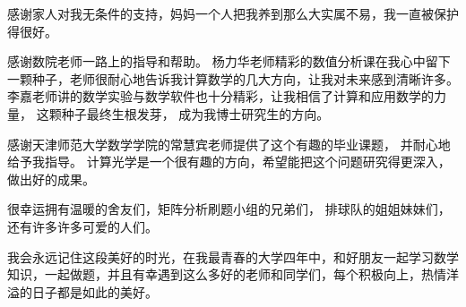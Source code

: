 \documentclass[12pt]{article}
\begin{document}
感谢家人对我无条件的支持，妈妈一个人把我养到那么大实属不易，我一直被保护得很好。

感谢数院老师一路上的指导和帮助。 杨力华老师精彩的数值分析课在我心中留下一颗种子，老师很耐心地告诉我计算数学的几大方向，让我对未来感到清晰许多。 李嘉老师讲的数学实验与数学软件也十分精彩，让我相信了计算和应用数学的力量， 这颗种子最终生根发芽， 成为我博士研究生的方向。

感谢天津师范大学数学学院的常慧宾老师提供了这个有趣的毕业课题， 并耐心地给予我指导。 计算光学是一个很有趣的方向，希望能把这个问题研究得更深入，做出好的成果。

很幸运拥有温暖的舍友们，矩阵分析刷题小组的兄弟们， 排球队的姐姐妹妹们，还有许多许多可爱的人们。 

我会永远记住这段美好的时光，在我最青春的大学四年中，和好朋友一起学习数学知识，一起做题，并且有幸遇到这么多好的老师和同学们，每个积极向上，热情洋溢的日子都是如此的美好。

\newpage
 
 
\end{document}
